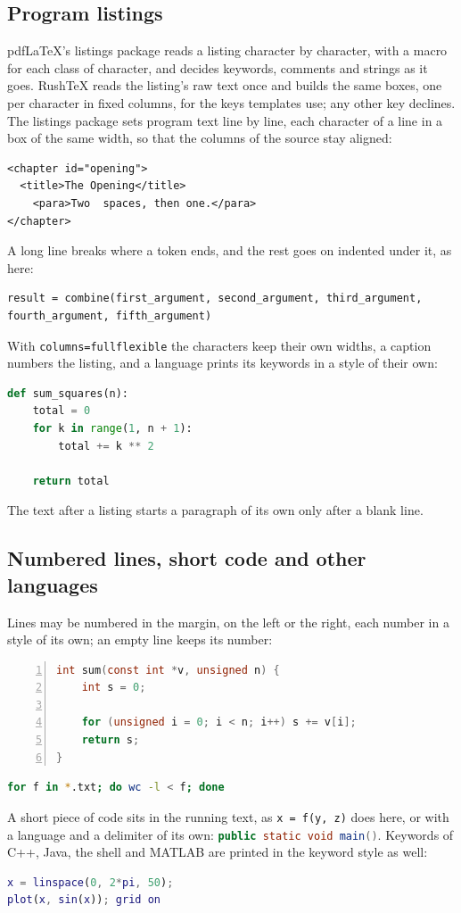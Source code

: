 \documentclass{article}
\numberwithin{equation}{section}
\theoremstyle{definition}
\theoremstyle{remark}
\begin{document}
\subsection{Program listings}\label{sec:listings}
pdfLaTeX's listings package reads a listing character by character, with a macro for each
class of character, and decides keywords, comments and strings as it goes. RushTeX reads
the listing's raw text once and builds the same boxes, one per character in fixed columns,
for the keys templates use; any other key declines.
The listings package sets program text line by line, each character of a line in a box of
the same width, so that the columns of the source stay aligned:
\begin{lstlisting}
<chapter id="opening">
  <title>The Opening</title>
    <para>Two  spaces, then one.</para>
</chapter>
\end{lstlisting}
A long line breaks where a token ends, and the rest goes on indented under it, as here:
\begin{lstlisting}[framerule=0pt,backgroundcolor=\color{rtblue!8}]
result = combine(first_argument, second_argument, third_argument, fourth_argument, fifth_argument)
\end{lstlisting}
With \texttt{columns=fullflexible} the characters keep their own widths, a caption numbers
the listing, and a language prints its keywords in a style of their own:
\begin{lstlisting}[columns=fullflexible,language=Python,keywordstyle=\color{rtblue}\bfseries,caption={Sums of squares.}]
def sum_squares(n):
    total = 0
    for k in range(1, n + 1):
        total += k ** 2

    return total
\end{lstlisting}
The text after a listing starts a paragraph of its own only after a blank line.

\subsection{Numbered lines, short code and other languages}\label{sec:lstmore}
Lines may be numbered in the margin, on the left or the right, each number in a style of
its own; an empty line keeps its number:
\begin{lstlisting}[language=C,numbers=left,numberstyle=\tiny\color{rtblue},keywordstyle=\color{rtdeep}\bfseries]
int sum(const int *v, unsigned n) {
    int s = 0;

    for (unsigned i = 0; i < n; i++) s += v[i];
    return s;
}
\end{lstlisting}
\begin{lstlisting}[language=bash,numbers=right,numbersep=6pt,frame=none]
for f in *.txt; do wc -l < f; done
\end{lstlisting}
A short piece of code sits in the running text, as \lstinline|x = f(y, z)| does here, or
with a language and a delimiter of its own: \lstinline[language=Java]!public static void main()!.
Keywords of C++, Java, the shell and MATLAB are printed in the keyword style as well:
\begin{lstlisting}[language=Matlab,columns=fullflexible]
x = linspace(0, 2*pi, 50);
plot(x, sin(x)); grid on
\end{lstlisting}
\end{document}
